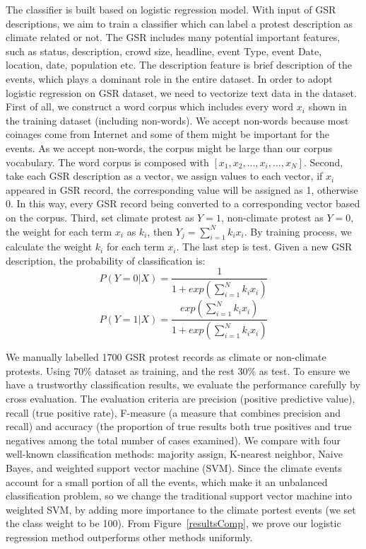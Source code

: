 \documentclass[9pt,twocolumn,twoside]{pnas-new}
\begin{document}
The classifier is built based on logistic regression model. With input of GSR descriptions, we aim to train a classifier which can label a protest description as climate related or not. The GSR includes many potential important features, such as status, description, crowd size, headline, event Type, event Date, location, date, population etc. The description feature is brief description of the events, which plays a dominant role in the entire dataset. In order to adopt logistic regression on GSR dataset, we need to vectorize text data in the dataset. First of all, we construct a word corpus which includes every word $x_i$ shown in the training dataset (including non-words). We accept non-words because most coinages come from Internet and some of them might be important for the events. As we accept non-words, the corpus might be large than our corpus vocabulary. The word corpus is composed with $[x_1, x_2, ..., x_i, ..., x_N]$.
Second, take each GSR description as a vector, we assign values to each vector, if $x_i$ appeared in GSR record, the corresponding value will be assigned as 1, otherwise 0. In this way, every GSR record being converted to a corresponding vector based on the corpus. Third, set climate protest as $Y=1$, non-climate protest as $Y=0$, the weight for each term $x_i$ as $k_i$, then $Y_j = \sum_{i=1}^{N} k_i x_i $. By training process, we calculate the weight $k_i$ for each term $x_i$. The last step is test. Given a new GSR description, the probability of classification is:
$$P(Y = 0| X)= \frac{1}{1+exp( {\sum_{i=1}^{N} k_ix_i})}$$
$$P(Y = 1| X)= \frac{exp( {\sum_{i=1}^{N} k_ix_i})}{1+exp( {\sum_{i=1}^{N} k_ix_i})}$$


We manually labelled 1700 GSR protest records as climate or non-climate protests. Using 70\% dataset as training, and the rest 30\% as test. To ensure we have a trustworthy classification results, we evaluate the performance carefully by cross evaluation. The evaluation criteria are precision (positive predictive value), recall (true positive rate), F-measure (a measure that combines precision and recall) and accuracy (the proportion of true results both true positives and true negatives among the total number of cases examined). We compare with four well-known classification methods: majority assign, K-nearest neighbor, Naive Bayes, and weighted support vector machine (SVM). Since the climate events account for a small portion of all the events, which make it an unbalanced classification problem, so we change the traditional support vector machine into weighted SVM, by adding more importance to the climate portest events (we set the class weight to be 100). From Figure~\ref{resultsComp}, we prove our logistic regression method outperforms other methods uniformly.
\end{document}
